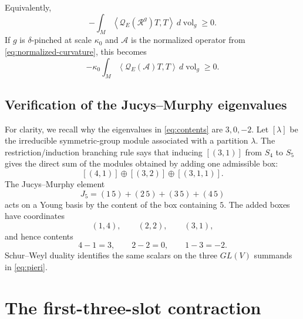 \documentclass[reqno,11pt]{amsart}
\theoremstyle{definition}
\newcommand{\Rop}{\mathscr R}
\newcommand{\cA}{\mathcal A}
\newcommand{\cQ}{\mathcal Q}
\newcommand{\vol}{\operatorname{vol}}
\newcommand{\inner}[2]{\left\langle #1,#2\right\rangle}
\begin{document}
Equivalently,
\begin{equation*}
  -\int_M\inner{\cQ_E(\Rop^g)T}{T}\,d\vol_g\geq0.
\end{equation*}
If $g$ is $\delta$-pinched at scale $\kappa_0$ and $\cA$ is the normalized
operator from \eqref{eq:normalized-curvature}, this becomes
\begin{equation}\label{eq:integral-negative-Q}
  -\kappa_0\int_M\inner{\cQ_E(\cA)T}{T}\,d\vol_g\geq0.
\end{equation}

\subsection{Verification of the Jucys--Murphy eigenvalues}\label{app:JM-verification}

For clarity, we recall why the eigenvalues in \eqref{eq:contents} are
$3,0,-2$. Let $[\lambda]$ be the irreducible symmetric-group module associated
with a partition $\lambda$. The restriction/induction branching rule says
that inducing $[(3,1)]$ from $S_4$ to $S_5$ gives the direct sum of the modules
obtained by adding one admissible box:
$$
  [(4,1)]\oplus[(3,2)]\oplus[(3,1,1)].
$$
The Jucys--Murphy element
$$
  J_5=(1\,5)+(2\,5)+(3\,5)+(4\,5)
$$
acts on a Young basis by the content of the box containing $5$. The added boxes
have coordinates
$$
  (1,4),\qquad(2,2),\qquad(3,1),
$$
and hence contents
$$
  4-1=3,
  \qquad
  2-2=0,
  \qquad
  1-3=-2.
$$
Schur--Weyl duality identifies the same scalars on the three $GL(V)$ summands
in \eqref{eq:pieri}.

\section{The first-three-slot contraction}\label{app:first-three-slot}
\end{document}
